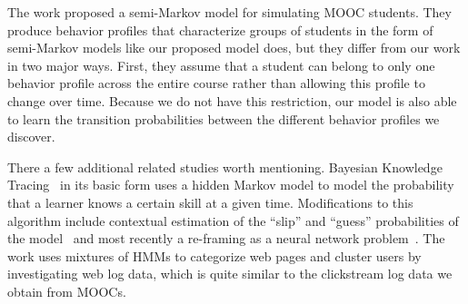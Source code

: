 The work \citet{Faucon:2016:EDM} proposed a semi-Markov model for simulating MOOC
students. They produce behavior profiles that characterize groups of
students in the form of semi-Markov models like our proposed model does,
but they differ from our work in two major ways. First, they assume that a
student can belong to only one behavior profile across the entire course
rather than allowing this profile to change over time.  Because we do not
have this restriction, our model is also able to learn the transition
probabilities between the different behavior profiles we discover.


There a few additional related studies worth mentioning. %
Bayesian Knowledge Tracing~\cite{Corbett:1994:UMUAI} in its basic form uses
a hidden Markov model to model the probability that a learner knows a
certain skill at a given time. Modifications to this algorithm include
contextual estimation of the ``slip'' and ``guess'' probabilities of the
model~\cite{Baker:2008:ITS} and most recently a re-framing as a neural
network problem~\cite{Piech:2015:NIPS}.
The work \citet{Ypma:2002:Springer} uses mixtures of HMMs to categorize web pages and
cluster users by investigating web log data, which is quite similar to the
clickstream log data we obtain from MOOCs.

